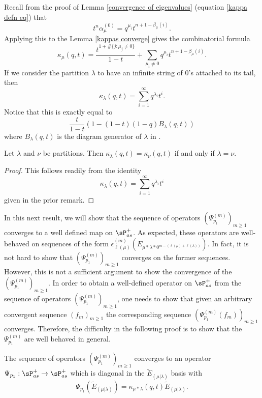 \begin{rema}
    Recall from the proof of Lemma \ref{convergence of eigenvalues} (equation \eqref{kappa defn eq}) that 
    $$t^n\alpha_{\mu}^{(0)} = q^{\mu_i}t^{n+1-\beta_{\mu}(i)}.$$ Applying this to the Lemma \ref{kappas converge} gives the combinatorial formula 
    $$\kappa_{\mu}(q,t) = \frac{t^{1+\#\{j:\mu_j \neq 0\}}}{1-t}+ \sum_{\mu_i \neq 0} q^{\mu_i}t^{n+1- \beta_{\mu}(i)}.$$ If we consider the partition $\lambda$ to have an infinite string of $0$'s attached to its tail, then 
    $$\kappa_{\lambda}(q,t) = \sum_{i=1}^{\infty} q^{\lambda_i}t^{i}.$$ Notice that this is exactly equal to 
    $$\frac{t}{1-t}\left(1 - (1-t)(1-q)B_{\lambda}(q,t) \right)$$ where $B_{\lambda}(q,t)$ is the diagram generator of $\lambda$ in \cite[Section 2, (2.12), page 7]{HMacDG}.
\end{rema}

\begin{coro}
    Let $\lambda$ and $\nu$ be partitions. Then $\kappa_{\lambda}(q,t) = \kappa_{\nu}(q,t)$ if and only if $\lambda = \nu$.
\end{coro}
\begin{proof}
    This follows readily from the identity 
    $$\kappa_{\lambda}(q,t) =  \sum_{i=1}^{\infty} q^{\lambda_i}t^{i}$$ given in the prior remark. 
\end{proof}

In this next result, we will show that the sequence of operators $(\Psi_{p_1}^{(m)})_{m\geq 1}$ converges to a well defined map on $\sP_{as}^{+}$. As expected, these operators are well-behaved on sequences of the form $\epsilon_{\ell(\mu)}^{(m)}(E_{\mu*\lambda*0^{m-(\ell(\mu)+\ell(\lambda))}}).$ In fact, it is not hard to show that $(\Psi_{p_1}^{(m)})_{m\geq 1}$ converges on the former sequences. However, this is not a sufficient argument to show the convergence of the $(\Psi_{p_1}^{(m)})_{m\geq 1}$. In order to obtain a well-defined operator on $\sP_{as}^{+}$ from the sequence of operators $(\Psi_{p_1}^{(m)})_{m\geq 1}$, one needs to show that given an arbitrary convergent sequence $(f_m)_{m\geq 1}$ the corresponding sequence $(\Psi_{p_1}^{(m)}(f_m))_{m\geq 1}$ converges. Therefore, the difficulty in the following proof is to show that the $\Psi_{p_1}^{(m)}$ are well behaved in general.


\begin{thm}\label{psi 1 converges}
    The sequence of operators $(\Psi_{p_1}^{(m)})_{m\geq 1}$ converges to an operator $\Psi_{p_1}: \sP_{as}^{+}\rightarrow \sP_{as}^{+}$ which is diagonal in the $\widetilde{E}_{(\mu|\lambda)}$ basis with 
    \begin{equation}
        \Psi_{p_1}(\widetilde{E}_{(\mu|\lambda)}) = \kappa_{\mu*\lambda}(q,t) \widetilde{E}_{(\mu|\lambda)}.
    \end{equation}
    
\end{thm}

